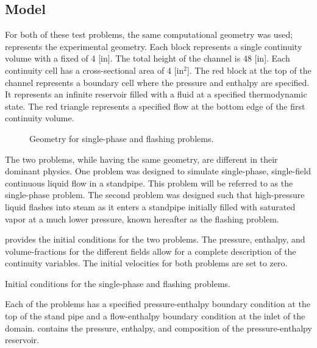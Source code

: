 \subsection{Model}
\label{subsect:single_model}
For both of these test problems, the same computational geometry was used;   represents the experimental geometry.
Each block represents a single continuity volume with a fixed \dx{} of 4 [in].
The total height of the channel is 48 [in].
Each continuity cell has a cross-sectional area of 4 [in$^2$].
The red block at the top of the channel represents a boundary cell where the pressure and enthalpy are specified.
It represents an infinite reservoir filled with a fluid at a specified thermodynamic state.
The red triangle represents a specified flow at the bottom edge of the first continuity volume. 

\begin{figure}[h!t]
\centering

\caption{Geometry for single-phase and flashing problems.}
\label{fig:exp_geometry}
\end{figure}

The two problems, while having the same geometry, are different in their dominant physics.
One problem was designed to simulate single-phase, single-field continuous liquid flow in a standpipe.
This problem will be referred to as the single-phase problem.
The second problem was designed such that high-pressure liquid flashes into steam as it enters a standpipe initially filled with saturated vapor at a much lower pressure, known hereafter as the flashing problem.

 provides the initial conditions for the two problems.
The pressure, enthalpy, and volume-fractions for the different fields allow for a complete description of the continuity variables.
The initial velocities for both problems are set to zero.

\begin{table}[ht]
\centering
\singlespace

\caption{Initial conditions for the single-phase and flashing problems.}
\label{tab:dualInitialConditions}
\end{table}

Each of the problems has a specified pressure-enthalpy boundary condition at the top of the stand pipe and a flow-enthalpy boundary condition at the inlet of the domain.
 contains the pressure, enthalpy, and composition of the pressure-enthalpy reservoir. 

